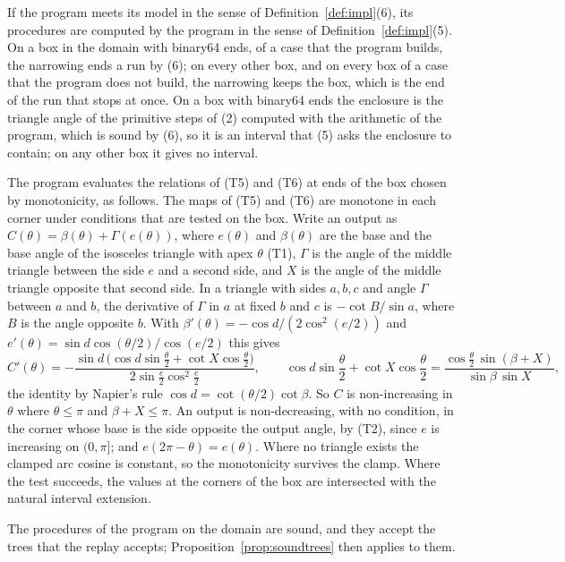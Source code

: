 \documentclass[12pt]{amsart}
\theoremstyle{definition}
\theoremstyle{plain}
\theoremstyle{definition}
\begin{document}
If the program meets its model in the sense of Definition~\ref{def:impl}(6), its procedures are computed by the program in the sense of Definition~\ref{def:impl}(5). On a box in the domain with binary64 ends, of a case that the program builds, the narrowing ends a run by (6); on every other box, and on every box of a case that the program does not build, the narrowing keeps the box, which is the end of the run that stops at once. On a box with binary64 ends the enclosure is the triangle angle of the primitive steps of (2) computed with the arithmetic of the program, which is sound by (6), so it is an interval that (5) asks the enclosure to contain; on any other box it gives no interval.

The program evaluates the relations of (T5) and (T6) at ends of the box chosen by monotonicity, as follows.
The maps of (T5) and (T6) are monotone in each corner under conditions that are tested on the box. Write an output as $C(\theta)=\beta(\theta)+\Gamma(e(\theta))$, where $e(\theta)$ and $\beta(\theta)$ are the base and the base angle of the isosceles triangle with apex $\theta$ (T1), $\Gamma$ is the angle of the middle triangle between the side $e$ and a second side, and $X$ is the angle of the middle triangle opposite that second side. In a triangle with sides $a,b,c$ and angle $\Gamma$ between $a$ and $b$, the derivative of $\Gamma$ in $a$ at fixed $b$ and $c$ is $-\cot B/\sin a$, where $B$ is the angle opposite $b$. With $\beta'(\theta)=-\cos d/(2\cos^2(e/2))$ and $e'(\theta)=\sin d\cos(\theta/2)/\cos(e/2)$ this gives
\[
C'(\theta)=-\frac{\sin d\,\bigl(\cos d\sin\frac\theta2+\cot X\cos\frac\theta2\bigr)}{2\sin\frac e2\cos^2\frac e2},\qquad\cos d\sin\frac\theta2+\cot X\cos\frac\theta2=\frac{\cos\frac\theta2\,\sin(\beta+X)}{\sin\beta\,\sin X},
\]
the identity by Napier's rule $\cos d=\cot(\theta/2)\cot\beta$. So $C$ is non-increasing in $\theta$ where $\theta\le\pi$ and $\beta+X\le\pi$. An output is non-decreasing, with no condition, in the corner whose base is the side opposite the output angle, by (T2), since $e$ is increasing on $(0,\pi]$; and $e(2\pi-\theta)=e(\theta)$. Where no triangle exists the clamped arc cosine is constant, so the monotonicity survives the clamp. Where the test succeeds, the values at the corners of the box are intersected with the natural interval extension.

The procedures of the program on the domain are sound, and they accept the trees that the replay accepts; Proposition~\ref{prop:soundtrees} then applies to them.
\end{document}
